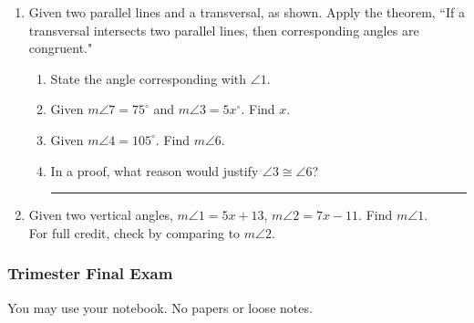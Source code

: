 \begin{enumerate}
\newpage
\item Given two parallel lines and a transversal, as shown. Apply the theorem, ``If a transversal intersects two parallel lines, then corresponding angles are congruent."
\begin{center}
\end{center}
\begin{enumerate}
\item State the angle corresponding with $\angle 1$. \bigskip
\item Given $m\angle 7 = 75^\circ$ and $m\angle 3 = 5x^\circ$. Find $x$. \bigskip
\item Given $m\angle 4 = 105^\circ$. Find $m\angle 6$. \bigskip
\item In a proof, what reason would justify $\angle 3 \cong \angle 6$? \rule{6cm}{0.15mm}
\end{enumerate}

\item Given two vertical angles, $m \angle 1 = 5x+13$, $m \angle 2 = 7x-11$. Find $m \angle 1$.\\
For full credit, check by comparing to $m\angle 2$.
  \begin{flushright}
  \end{flushright}

\end{enumerate}

\newpage %
\setcounter{page}{1}
\subsubsection*{Trimester Final Exam}
You may use your notebook. No papers or loose notes.

